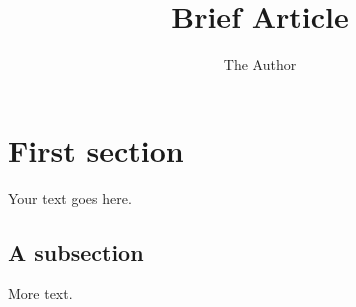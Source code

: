 \documentclass[11pt]{article} %
\title{Brief Article}
\author{The Author}
\begin{document}
\maketitle

\section{First section}

Your text goes here.

\subsection{A subsection}

More text.
\end{document}
